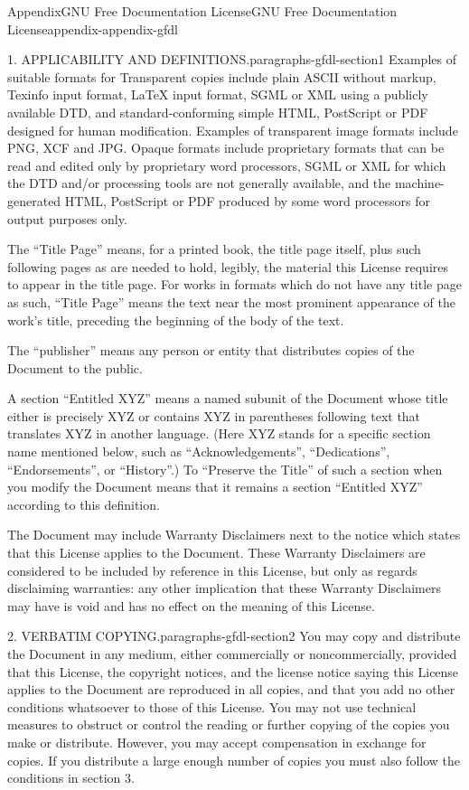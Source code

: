 \documentclass[twoside,10pt,]{book}
\numberwithin{equation}{part}
\begin{document}
\begin{appendixptx}{Appendix}{GNU Free Documentation License}{}{GNU Free Documentation License}{}{}{appendix-appendix-gfdl}
\begin{paragraphs}{1. APPLICABILITY AND DEFINITIONS.}{paragraphs-gfdl-section1}
Examples of suitable formats for Transparent copies include plain ASCII without markup, Texinfo input format, LaTeX input format, SGML or XML using a publicly available DTD, and standard-conforming simple HTML, PostScript or PDF designed for human modification. Examples of transparent image formats include PNG, XCF and JPG. Opaque formats include proprietary formats that can be read and edited only by proprietary word processors, SGML or XML for which the DTD and\slash{}or processing tools are not generally available, and the machine-generated HTML, PostScript or PDF produced by some word processors for output purposes only.%
\par
The ``Title Page'' means, for a printed book, the title page itself, plus such following pages as are needed to hold, legibly, the material this License requires to appear in the title page. For works in formats which do not have any title page as such, ``Title Page'' means the text near the most prominent appearance of the work's title, preceding the beginning of the body of the text.%
\par
The ``publisher'' means any person or entity that distributes copies of the Document to the public.%
\par
A section ``Entitled XYZ'' means a named subunit of the Document whose title either is precisely XYZ or contains XYZ in parentheses following text that translates XYZ in another language. (Here XYZ stands for a specific section name mentioned below, such as ``Acknowledgements'', ``Dedications'', ``Endorsements'', or ``History''.) To ``Preserve the Title'' of such a section when you modify the Document means that it remains a section ``Entitled XYZ'' according to this definition.%
\par
The Document may include Warranty Disclaimers next to the notice which states that this License applies to the Document. These Warranty Disclaimers are considered to be included by reference in this License, but only as regards disclaiming warranties: any other implication that these Warranty Disclaimers may have is void and has no effect on the meaning of this License.%
\end{paragraphs}%
\begin{paragraphs}{2. VERBATIM COPYING.}{paragraphs-gfdl-section2}%
You may copy and distribute the Document in any medium, either commercially or noncommercially, provided that this License, the copyright notices, and the license notice saying this License applies to the Document are reproduced in all copies, and that you add no other conditions whatsoever to those of this License. You may not use technical measures to obstruct or control the reading or further copying of the copies you make or distribute. However, you may accept compensation in exchange for copies. If you distribute a large enough number of copies you must also follow the conditions in section 3.%

\end{paragraphs}
\end{appendixptx}
\end{document}
